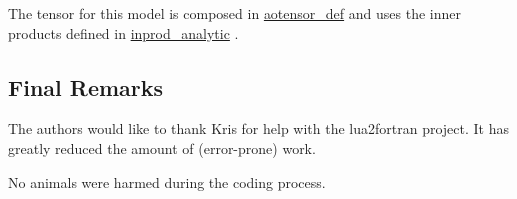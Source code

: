 The tensor for this model is composed in \hyperlink{classaotensor__def}{aotensor\-\_\-def} and uses the inner products defined in \hyperlink{classinprod__analytic}{inprod\-\_\-analytic} . 



\subsection*{Final Remarks}

The authors would like to thank Kris for help with the lua2fortran project. It has greatly reduced the amount of (error-\/prone) work.

No animals were harmed during the coding process. 